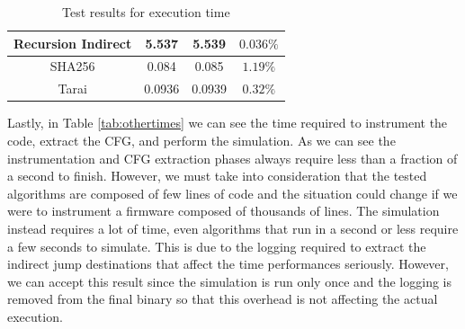 \begin{table}
\begin{tabular}{|c|c|c|c|}
    \hline
    Recursion Indirect          & 5.537                        & 5.539                        & $0.036\%$              \\
    \hline
    SHA256                      & 0.084                        & 0.085                        & $1.19\%$               \\
    \hline
    Tarai                       & 0.0936                       & 0.0939                       & $0.32\%$               \\
    \hline
  \end{tabular}
  \caption{Test results for execution time}
  \label{tab:times}
\end{table}

Lastly, in Table \ref{tab:othertimes} we can see the time required to instrument
the code, extract the CFG, and perform the simulation. As we can see the
instrumentation and CFG extraction phases always require less than a fraction of
a second to finish. However, we must take into consideration that the tested
algorithms are composed of few lines of code and the situation could change if
we were to instrument a firmware composed of thousands of lines. The simulation instead
requires a lot of time, even algorithms that run in a second or less require a
few seconds to simulate. This is due to the logging required to extract the indirect
jump destinations that affect the time performances seriously. However, we can accept
this result since the simulation is run only once and the logging is removed from
the final binary so that this overhead is not affecting the actual execution.

